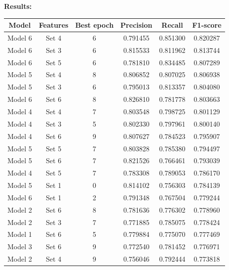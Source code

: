 \noindent\textbf{Results:}
\begin{table}[htbp]
    \centering
    \small
    \begin{tabular}{c|c|c|c|c|c}
        \textbf{Model} & \textbf{Features} & \textbf{Best epoch} & \textbf{Precision} & \textbf{Recall} & \textbf{F1-score} \\ \hline
        Model 6  &	Set 4      &	6	    &	0.791455    &	0.851300    &	0.820287    \\
        Model 6  &	Set 3      &	6	    &	0.815533    &	0.811962    &	0.813744    \\
        Model 6  &	Set 5      &	6	    &	0.781810    &	0.834485    &	0.807289    \\
        Model 5  &	Set 4      &	8	    &	0.806852    &	0.807025    &	0.806938    \\
        Model 5  &	Set 3      &	6	    &	0.795013    &	0.813357    &	0.804080    \\
        Model 6  &	Set 6      &	8	    &	0.826810    &	0.781778    &	0.803663    \\
        Model 4  &	Set 4      &	7	    &	0.803548    &	0.798725    &	0.801129    \\
        Model 4  &	Set 3      &	5	    &	0.802330    &	0.797961    &	0.800140    \\
        Model 4  &	Set 6      &	9	    &	0.807627    &	0.784523    &	0.795907    \\
        Model 5  &	Set 5      &	7	    &	0.803828    &	0.785380    &	0.794497    \\
        Model 5  &	Set 6      &	7	    &	0.821526    &	0.766461    &	0.793039    \\
        Model 4  &	Set 5      &	7	    &	0.783308    &	0.789053    &	0.786170    \\
        Model 5  &	Set 1      &	0	    &	0.814102    &	0.756303    &	0.784139    \\
        Model 6  &	Set 1      &	2	    &	0.791348    &	0.767504    &	0.779244    \\
        Model 2  &	Set 6      &	8	    &	0.781636    &	0.776302    &	0.778960    \\
        Model 2  &	Set 3      &	7	    &	0.771885    &	0.785075    &	0.778424    \\
        Model 1  &	Set 6      &	5	    &	0.779884    &	0.775070    &	0.777469    \\
        Model 3  &	Set 6      &	9	    &	0.772540    &	0.781452    &	0.776971    \\
        Model 2  &	Set 4      &	9	    &	0.756046    &	0.792444    &	0.773818    \\

\end{tabular}
\end{table}
